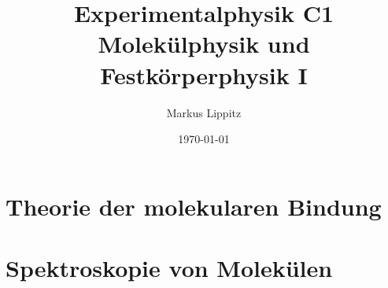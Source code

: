 \documentclass[notoc,nofonts,a4paper,twoside,nobib]{tufte-book}
\newcommand{\kapitelname}{Kapitel\ }
\begin{document}
  \tikzexternaldisable


\title{Experimentalphysik C1 \\ Molekülphysik und Festkörperphysik I}

\author{Markus Lippitz}
\date{\today}


\maketitle


%
\tableofcontents




\part{Theorie der molekularen Bindung}






\part{Spektroskopie von Molekülen}







%
%
%
%
%
%


%
%
%
%
%
%


\renewcommand{\kapitelname}{Anhang\ }


\appendix
\appendixpage





%

\printbibliography
\end{document}
